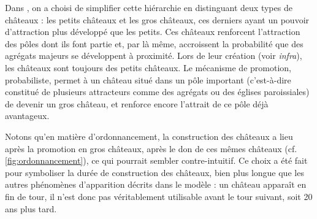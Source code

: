 \begin{tcolorbox}[breakable,left=0pt,right=0pt,top=0pt,bottom=0pt,
	colback=gray!15,colframe=gray!15,width=\dimexpr\textwidth\relax, 
	enlarge left by=0mm, boxsep=5pt,arc=0pt,outer arc=0pt]
	Dans \simfeodal{}, on a choisi de simplifier cette hiérarchie en distinguant deux types de châteaux : les \og petits châteaux\fg{} et les \og gros châteaux\fg{}, ces derniers ayant un pouvoir d'attraction plus développé que les petits.
	Ces châteaux renforcent l'attraction des pôles dont ils font partie et, par là même, accroissent la probabilité que des agrégats majeurs se développent à proximité.
	Lors de leur création (voir \textit{infra}), les châteaux sont toujours des \og petits châteaux\fg{}.
	Le mécanisme de promotion, probabiliste, permet à un château situé dans un pôle important (c'est-à-dire constitué de plusieurs attracteurs comme des agrégats ou des églises paroissiales) de devenir un \og gros château\fg{}, et renforce encore l'attrait de ce pôle déjà avantageux.
\end{tcolorbox}

\bigskip
\begin{tcolorbox}[breakable,left=0pt,right=0pt,top=0pt,bottom=0pt,
	colback=gray!15,colframe=gray!15,width=\dimexpr\textwidth\relax, 
	enlarge left by=0mm, boxsep=5pt,arc=0pt,outer arc=0pt]
Notons qu'en matière d'ordonnancement, la construction des châteaux a lieu après la promotion en gros châteaux, après le don de ces mêmes châteaux (cf. \cref{fig:ordonnancement}), ce qui pourrait sembler contre-intuitif.
Ce choix a été fait pour symboliser la durée de construction des châteaux, bien plus longue que les autres phénomènes d'apparition décrits dans le modèle : un château apparaît en fin de tour, il n'est donc pas véritablement utilisable avant le tour suivant, soit 20 ans plus tard.
\end{tcolorbox}


